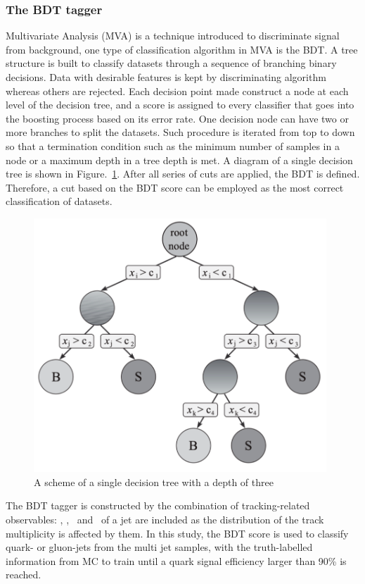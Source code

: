 \subsubsection{The BDT tagger}

Multivariate Analysis (MVA) is a technique introduced to discriminate signal from background, one type of classification algorithm in MVA is the BDT. A tree structure is built to classify datasets through a sequence of branching binary decisions. Data with desirable features is kept by discriminating algorithm whereas others are rejected. Each decision point made construct a node at each level of the decision tree, and a score is assigned to every classifier that goes into the boosting process based on its error rate. One decision node can have two or more branches to split the datasets. Such procedure is iterated from top to down so that a termination condition such as the minimum number of samples in a node or a maximum depth in a tree depth is met. A diagram of a single decision tree is shown in Figure.~\ref{Fig.bdt}. After all series of cuts are applied, the BDT is defined. Therefore, a cut based on the BDT score can be employed as the most correct classification of datasets.

\begin{figure}[htb] 
	\centering  
	\includegraphics[width=11cm]{./fig/bdt.png}
	\caption{A scheme of a single decision tree with a depth of three}
	\label{Fig.bdt}
\end{figure}

The BDT tagger is constructed by the combination of tracking-related observables: \ntrk, \wtrk, \cbeta~and \pt~of a jet are included as the distribution of the track multiplicity is affected by them. In this study, the BDT score is used to classify quark- or gluon-jets from the multi jet samples, with the truth-labelled information from MC to train until a quark signal efficiency larger than 90\% is reached.



